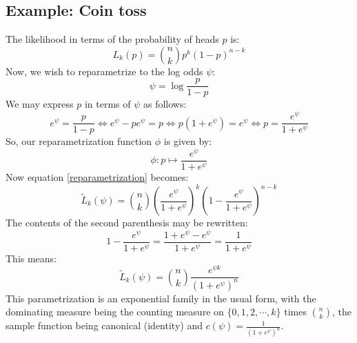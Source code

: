 \documentclass[12pt, a4paper]{article}
\numberwithin{equation}{section}
\begin{document}
\subsection{Example: Coin toss}
The likelihood in terms of the probability of heads $p$ is:
\begin{equation}
L_k(p)=\binom{n}{k}p^k(1-p)^{n-k}
\end{equation}
Now, we wish to reparametrize to the log odds $\psi$:
\begin{equation}
\psi=\log\frac{p}{1-p}
\end{equation}
We may express $p$ in terms of $\psi$ as follows:
\begin{equation}
e^\psi=\frac{p}{1-p}\Leftrightarrow e^\psi-pe^\psi=p\Leftrightarrow p\left(1+e^\psi\right)=e^\psi\Leftrightarrow p=\frac{e^\psi}{1+e^\psi}
\end{equation}
So, our reparametrization function $\phi$ is given by:
\begin{equation}
\phi:p\mapsto\frac{e^\psi}{1+e^\psi}
\end{equation}
Now equation \ref{reparametrization} becomes:
\begin{equation}
\tilde{L}_k(\psi)=\binom{n}{k}\left(\frac{e^\psi}{1+e^\psi}\right)^k\left(1-\frac{e^\psi}{1+e^\psi}\right)^{n-k}
\end{equation}
The contents of the second parenthesis may be rewritten:
\begin{equation}
1-\frac{e^\psi}{1+e^\psi}=\frac{1+e^\psi-e^\psi}{1+e^\psi}=\frac{1}{1+e^\psi}
\end{equation}
This means:
\begin{equation}
\tilde{L}_k(\psi)=\binom{n}{k}\frac{e^{\psi k}}{(1+e^\psi)^n}
\end{equation}
This parametrization is an exponential family in the usual form, with the dominating measure being the counting measure on $\{0,1,2,\cdots,k\}$ times $\binom{n}{k}$, the sample function being canonical (identity) and $c(\psi)=\frac{1}{(1+e^\psi)^n}$.
\end{document}

